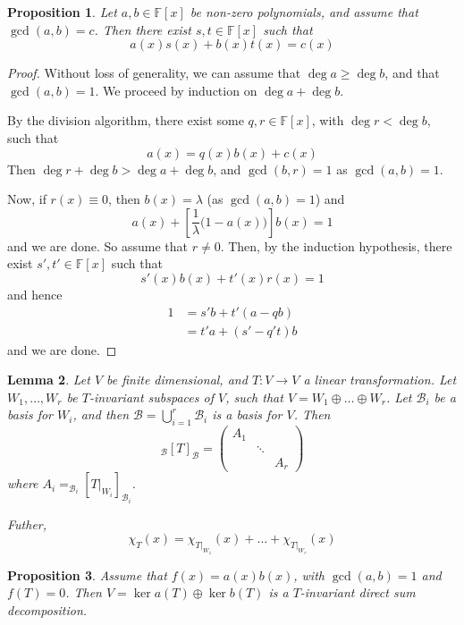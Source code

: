 \documentclass[10pt,fleqn]{article}
\newcommand{\field}{\mathbb{F}}
\newcommand{\basis}{\mathcal{B}}
\theoremstyle{definition} \newtheorem{defn}{Definition}[section]
\theoremstyle{plain}      \newtheorem{thm}[defn]{Theorem}
\theoremstyle{plain}      \newtheorem{prop}[defn]{Proposition}
\theoremstyle{plain}      \newtheorem{lem}[defn]{Lemma}
\theoremstyle{plain}      \newtheorem{cor}[defn]{Corollary}
\theoremstyle{plain}      \newtheorem{ad}[defn]{Addendum}
\theoremstyle{definition} \newtheorem{ex}[defn]{Example}
\theoremstyle{definition} \newtheorem{rem}[defn]{Remark}
\numberwithin{equation}{subsection}
\begin{document}
\begin{prop}
    Let $a,b\in\field[x]$ be non-zero polynomials, and assume that $\gcd(a,b)=c$.
    Then there exist $s,t\in\field[x]$ such that
    \[
        a(x)s(x)+b(x)t(x)=
        c(x)
    \]
\end{prop}

\begin{proof}
    Without loss of generality, we can assume that $\deg a\geq\deg b$, and that $\gcd(a,b)=1$.
    We proceed by induction on $\deg a+\deg b$.

    By the division algorithm, there exist some $q,r\in\field[x]$, with $\deg r<\deg b$, such that
    \[
        a(x)=
        q(x)b(x)+c(x)
    \]
    Then $\deg r+\deg b > \deg a +\deg b$, and $\gcd(b,r)=1$ as $\gcd(a,b)=1$.

    Now, if $r(x)\equiv0$, then $b(x)=\lambda$ (as $\gcd(a,b)=1$) and
    \[
        a(x)+\left[\frac{1}{\lambda}\big(1-a(x)\big)\right]b(x)=
        1
    \]
    and we are done.
    So assume that $r\neq0$.
    Then, by the induction hypothesis, there exist $s',t'\in\field[x]$ such that
    \[
        s'(x)b(x)+t'(x)r(x)=
        1
    \]
    and hence
    \begin{align*}
        1
        &=
        s'b+t'(a-qb)\\
        &=
        t'a+(s'-q't)b
    \end{align*}
    and we are done.
\end{proof}

\begin{lem}
    Let $V$ be finite dimensional, and $T:V\to V$ a linear transformation.
    Let $W_1,\ldots,W_r$ be $T$-invariant subspaces of $V$, such that $V=W_1\oplus\ldots\oplus W_r$.
    Let $\basis_i$ be a basis for $W_i$, and then $\basis=\bigcup_{i=1}^r\basis_i$ is a basis for $V$.
    Then
    \[
        _{\basis}[T]_{\basis}=
        \left(
        \begin{array}{ccc}
            A_1 &        & \\
                & \ddots & \\
                &        & A_r
        \end{array}
        \right)
    \]
    where $A_i=_{\basis_i}[T|_{W_i}]_{\basis_i}$.

    Futher,
    \[
        \chi_T(x)=\chi_{T|_{W_1}}(x)+\ldots+\chi_{T|_{W_r}}(x)
    \]
\end{lem}

\begin{prop}\label{dir-sum-decomp}
    Assume that $f(x)=a(x)b(x)$, with $\gcd(a,b)=1$ and $f(T)=0$.
    Then $V=\ker a(T)\oplus\ker b(T)$ is a $T$-invariant direct sum decomposition.
\end{prop}
\end{document}
